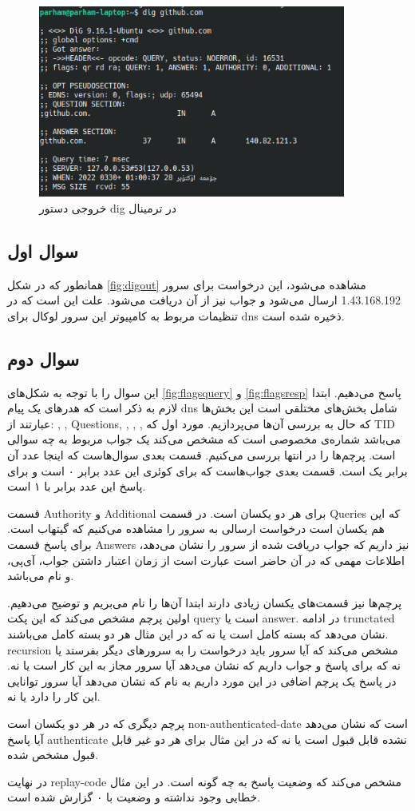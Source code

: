 \documentclass{article}
\begin{document}
\begin{figure}[h!]
	\centering
	\includegraphics[width=0.9\textwidth]{src/digrunterm.png}
	\caption{
		خروجی دستور dig در ترمینال
	}
	\label{fig:digrunterm}
\end{figure}
\subsection{سوال اول}
همانطور که در شکل \ref{fig:digout} مشاهده می‌شود، این درخواست برای سرور 1.43.168.192 ارسال می‌شود و جواب نیز از آن دریافت می‌شود. علت این است که در تنظیمات مربوط به کامپیوتر این سرور لوکال برای dns ذخیره شده است.
\subsection{سوال دوم}
این سوال را با توجه به شکل‌های \ref{fig:flagsquery} و \ref{fig:flagsresp} پاسخ می‌دهیم. ابتدا لازم به ذکر است که هدر‌های یک پیام dns شامل بخش‌های مختلقی است این بخش‌ها عبارتند از: 
, 
, 
Questions,
,
,
,
که حال به بررسی آن‌ها می‌پردازیم. مورد اول که TID می‌باشد شماره‌ی مخصوصی است که مشخص می‌کند یک جواب مربوط به چه سوالی است. پرچم‌ها را در انتها بررسی می‌کنیم. قسمت بعدی سوال‌هاست که اینجا عدد آن برابر یک است. قسمت بعدی جواب‌هاست که برای کوئری این عدد برابر ۰ است و برای پاسخ این عدد برابر با ۱ است.

قسمت Authority و Additional برای هر دو یکسان است. در قسمت Queries که این هم یکسان است درخواست ارسالی به سرور را مشاهده می‌کنیم که گیتهاب است. برای پاسخ قسمت Answers نیز داریم که جواب دریافت شده از سرور را نشان می‌دهد، اطلاعات مهمی که در آن حاضر است عبارت است از زمان اعتبار داشتن جواب، آی‌پی، و نام می‌باشد.

پرچم‌ها نیز قسمت‌های یکسان زیادی دارند ابتدا آن‌ها را نام می‌بریم و توضیح می‌دهیم. اولین پرچم مشخص می‌کند که این پکت query است یا answer. در ادامه trunctated نشان می‌دهد که بسته کامل است یا نه که در این مثال هر دو بسته کامل می‌باشند. recursion مشخص می‌کند که آیا سرور باید درخواست را به سرور‌های دیگر بفرستد یا نه که برای پاسخ و جواب  داریم که نشان می‌دهد آیا سرور مجاز به این کار است یا نه. در پاسخ یک پرچم اضافی در این مورد داریم به نام 
که نشان می‌دهد آیا سرور توانایی این کار را دارد یا نه.

پرچم دیگری که در هر دو یکسان  است non-authenticated-date است که نشان می‌دهد آیا پاسخ authenticate نشده قابل قبول است یا نه که در این مثال برای هر دو غیر قابل قبول مشخص شده.

در نهایت replay-code مشخص می‌کند که وضعیت پاسخ به چه گونه است. در این مثال خطایی وجود نداشته و وضعیت با ۰ گزارش شده است.
\end{document}
